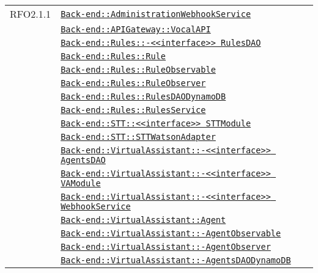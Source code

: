 \begin{longtable}{|>{\centering}m{3cm}|m{10cm}<{\centering}|}
RFO2.1.1 & \hyperref[Back-end::AdministrationWebhookService]{\texttt{Back-end::AdministrationWebhookService}}\\
& \hyperref[Back-end::APIGateway::VocalAPI]{\texttt{Back-end::APIGateway::VocalAPI}}\\
& \hyperref[Back-end::Rules::<<interface>> RulesDAO]{\texttt{Back-end::Rules::-\linebreak <<interface>> RulesDAO}}\\
& \hyperref[Back-end::Rules::Rule]{\texttt{Back-end::Rules::Rule}}\\
& \hyperref[Back-end::Rules::RuleObservable]{\texttt{Back-end::Rules::RuleObservable}}\\
& \hyperref[Back-end::Rules::RuleObserver]{\texttt{Back-end::Rules::RuleObserver}}\\
& \hyperref[Back-end::Rules::RulesDAODynamoDB]{\texttt{Back-end::Rules::RulesDAODynamoDB}}\\
& \hyperref[Back-end::Rules::RulesService]{\texttt{Back-end::Rules::RulesService}}\\
& \hyperref[Back-end::STT::<<interface>> STTModule]{\texttt{Back-end::STT::<<interface>> STTModule}}\\
& \hyperref[Back-end::STT::STTWatsonAdapter]{\texttt{Back-end::STT::STTWatsonAdapter}}\\
& \hyperref[Back-end::VirtualAssistant::<<interface>> AgentsDAO]{\texttt{Back-end::VirtualAssistant::-\linebreak <<interface>> AgentsDAO}}\\
& \hyperref[Back-end::VirtualAssistant::<<interface>> VAModule]{\texttt{Back-end::VirtualAssistant::-\linebreak <<interface>> VAModule}}\\
& \hyperref[Back-end::VirtualAssistant::<<interface>> WebhookService]{\texttt{Back-end::VirtualAssistant::-\linebreak <<interface>> WebhookService}}\\
& \hyperref[Back-end::VirtualAssistant::Agent]{\texttt{Back-end::VirtualAssistant::Agent}}\\
& \hyperref[Back-end::VirtualAssistant::AgentObservable]{\texttt{Back-end::VirtualAssistant::-\linebreak AgentObservable}}\\
& \hyperref[Back-end::VirtualAssistant::AgentObserver]{\texttt{Back-end::VirtualAssistant::-\linebreak AgentObserver}}\\
& \hyperref[Back-end::VirtualAssistant::AgentsDAODynamoDB]{\texttt{Back-end::VirtualAssistant::-\linebreak AgentsDAODynamoDB}}\\

\end{longtable}

